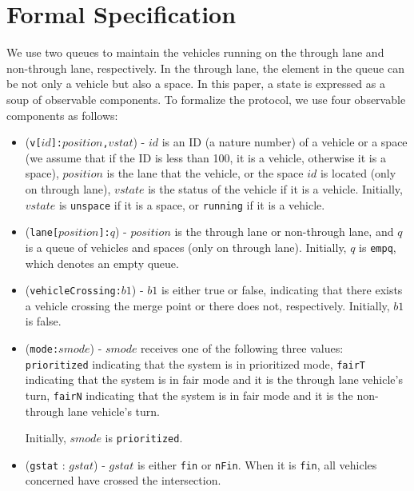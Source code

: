 \documentclass[10pt, conference, compsocconf]{IEEEtran}
\begin{document}
\section{Formal Specification}
 \label{sect_formal}
We use two queues to maintain the vehicles running on the through lane and non-through lane, respectively.
In the through lane, the element in the queue can be not only a vehicle but also a space.
In this paper, a state is expressed as a soup of observable components.
To formalize the protocol, we use four observable components as follows:
\begin{itemize}
  \item (\verb!v[!$id$\verb!]:!$position$\verb!,!$vstat$) - $id$ is an ID (a nature number) of 
  a vehicle or a space (we assume that if the ID is less than 100, it is a vehicle, otherwise it is a space), 
  $position$ is the lane that the vehicle, or the space $id$ is located 
  (only on through lane), $vstate$ is the status of the vehicle if it is a 
  vehicle. Initially, $vstate$ is \verb!unspace! if it is a space, or \verb!running! if it is a vehicle.
  \item (\verb!lane[!$position$\verb!]:!$q$) - $position$ is the through lane or 
  non-through lane, and $q$ is a queue of vehicles and spaces (only on through lane). 
  Initially, $q$ is \verb!empq!, which denotes an empty queue.
    
  \item (\verb!vehicleCrossing:!$b1$) - $b1$ is either true or false, indicating that there 
  exists a vehicle crossing the merge point or there does not, respectively. Initially, $b1$ is false.
  
  \item (\verb!mode:!$smode$) - $smode$ receives one of the following three values: 
  \verb!prioritized! indicating that the system is in prioritized mode, 
  \verb!fairT! indicating that the system is in fair mode and it is the through lane vehicle's turn,
  \verb!fairN! indicating that the system is in fair mode and it is the non-through lane vehicle's turn.
  
  Initially, $smode$ is \verb!prioritized!.
  
  \item (\verb!gstat! : $gstat$) -  $gstat$ is either \verb!fin! or \verb!nFin!.
  When it is \verb!fin!, all vehicles concerned have crossed the intersection.
\end{itemize}
\end{document}
